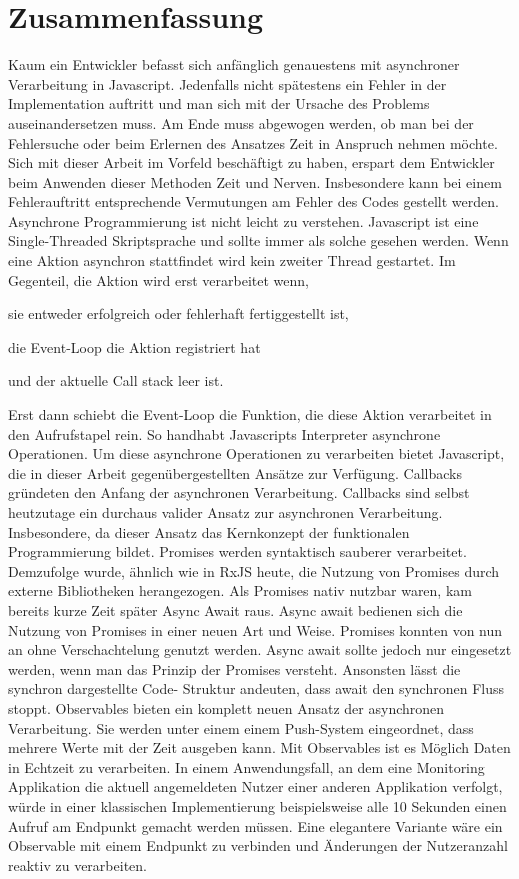\section{Zusammenfassung}

Kaum ein Entwickler befasst sich anfänglich genauestens mit asynchroner Verarbeitung in Javascript. Jedenfalls nicht spätestens ein Fehler in der Implementation auftritt und man sich mit der Ursache des Problems auseinandersetzen muss. Am Ende muss abgewogen werden, ob man bei der Fehlersuche oder beim Erlernen des Ansatzes Zeit in Anspruch nehmen möchte. Sich mit dieser Arbeit im Vorfeld beschäftigt zu haben, erspart dem Entwickler beim Anwenden dieser Methoden Zeit und Nerven. Insbesondere kann bei einem Fehlerauftritt entsprechende Vermutungen am Fehler des Codes gestellt werden. Asynchrone Programmierung ist nicht leicht zu verstehen. Javascript ist eine Single-Threaded Skriptsprache und sollte immer als solche gesehen werden. Wenn eine Aktion asynchron stattfindet wird kein zweiter Thread gestartet. Im Gegenteil, die Aktion wird erst verarbeitet wenn, 

\begin{description}
\item sie entweder erfolgreich oder fehlerhaft fertiggestellt ist,
\item die Event-Loop die Aktion registriert hat
\item und der aktuelle Call stack leer ist.
\end{description}

\noindent
Erst dann schiebt die Event-Loop die Funktion, die diese Aktion verarbeitet in den Aufrufstapel rein. So handhabt Javascripts Interpreter asynchrone Operationen. Um diese asynchrone Operationen zu verarbeiten bietet Javascript, die in dieser Arbeit gegenübergestellten Ansätze zur Verfügung. Callbacks gründeten den Anfang der asynchronen Verarbeitung. Callbacks sind selbst heutzutage ein durchaus valider Ansatz zur asynchronen Verarbeitung. Insbesondere, da dieser Ansatz das Kernkonzept der funktionalen Programmierung bildet. Promises werden syntaktisch \glqq sauberer\grqq{} verarbeitet. Demzufolge wurde, ähnlich wie in RxJS heute, die Nutzung von Promises durch externe Bibliotheken herangezogen. Als Promises nativ nutzbar waren, kam bereits kurze Zeit später Async Await raus. Async await bedienen sich die Nutzung von Promises in einer neuen Art und Weise. Promises konnten von nun an ohne Verschachtelung genutzt werden. Async await sollte jedoch nur eingesetzt werden, wenn man das Prinzip der Promises versteht. Ansonsten lässt die synchron dargestellte Code- Struktur andeuten, dass await den synchronen Fluss stoppt. Observables bieten ein komplett neuen Ansatz der asynchronen Verarbeitung. Sie werden unter einem einem Push-System eingeordnet, dass mehrere Werte mit der Zeit ausgeben kann. Mit Observables ist es Möglich Daten in Echtzeit zu verarbeiten. In einem Anwendungsfall, an dem eine Monitoring Applikation die aktuell angemeldeten Nutzer einer anderen Applikation verfolgt, würde in einer klassischen Implementierung beispielsweise alle 10 Sekunden einen Aufruf am Endpunkt gemacht werden müssen. Eine elegantere Variante wäre ein Observable mit einem Endpunkt zu verbinden und Änderungen der Nutzeranzahl reaktiv  zu verarbeiten.
